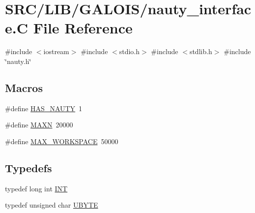 \hypertarget{nauty__interface_8_c}{}\section{S\+R\+C/\+L\+I\+B/\+G\+A\+L\+O\+I\+S/nauty\+\_\+interface.C File Reference}
\label{nauty__interface_8_c}
{\ttfamily \#include $<$iostream$>$}\newline
{\ttfamily \#include $<$stdio.\+h$>$}\newline
{\ttfamily \#include $<$stdlib.\+h$>$}\newline
{\ttfamily \#include \char`\"{}nauty.\+h\char`\"{}}\newline
\subsection*{Macros}
\begin{DoxyCompactItemize}
\item 
\#define \mbox{\hyperlink{nauty__interface_8_c_aac22239ae38a438deb8cb0ab7d6a9ed4}{H\+A\+S\+\_\+\+N\+A\+U\+TY}}~1
\item 
\#define \mbox{\hyperlink{nauty__interface_8_c_ad1f79d9d99776d7353c6659c307c83c6}{M\+A\+XN}}~20000
\item 
\#define \mbox{\hyperlink{nauty__interface_8_c_a174c86b0387f73e7d3a889e2af6d06b6}{M\+A\+X\+\_\+\+W\+O\+R\+K\+S\+P\+A\+CE}}~50000
\end{DoxyCompactItemize}
\subsection*{Typedefs}
\begin{DoxyCompactItemize}
\item 
typedef long int \mbox{\hyperlink{nauty__interface_8_c_a09fddde158a3a20bd2dcadb609de11dc}{I\+NT}}
\item 
typedef unsigned char \mbox{\hyperlink{nauty__interface_8_c_a122c4acf389c050379f00341fdcd5812}{U\+B\+Y\+TE}}
\end{DoxyCompactItemize}
